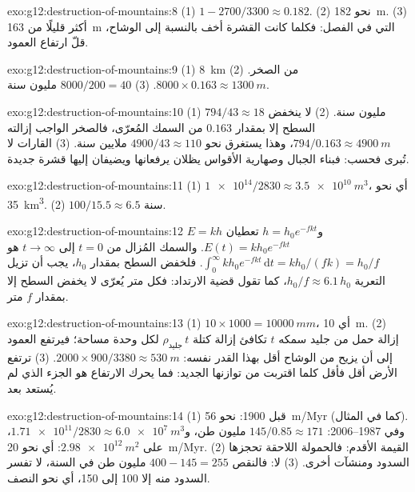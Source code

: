 \begin{solution}{exo:g12:destruction-of-mountains:8}
(1) $1 - 2700/3300 \approx 0.182$. (2) نحو \qty{182}{m}. (3) أكثر قليلًا
من \qty{163}{m} التي في الفصل: فكلما كانت القشرة أخف بالنسبة إلى
الوشاح، قلّ ارتفاع العمود.
\end{solution}

\begin{solution}{exo:g12:destruction-of-mountains:9}
(1) \qty{8}{km} من الصخر. (2) $8000 \times 0.163 \approx \qty{1300}{m}$.
(3) $8000/200 = 40$ مليون سنة.
\end{solution}

\begin{solution}{exo:g12:destruction-of-mountains:10}
(1) $794/43 \approx 18$ مليون سنة. (2) لا ينخفض السطح إلا بمقدار
$0.163$ من السمك المُعرّى، فالصخر الواجب إزالته $794/0.163
\approx \qty{4900}{m}$، وهذا يستغرق نحو $4900/43 \approx 110$ ملايين سنة.
(3) القارات لا تُبرى فحسب: فبناء الجبال وصهارية
الأقواس يظلان يرفعانها ويضيفان إليها قشرة جديدة.
\end{solution}

\begin{solution}{exo:g12:destruction-of-mountains:11}
(1) $\num{1e14}/2830 \approx \qty{3.5e10}{m^3}$، أي نحو
\qty{35}{km^3}. (2) $100/15.5 \approx 6.5$ سنة.
\end{solution}

\begin{solution}{exo:g12:destruction-of-mountains:12}
$E = kh$ و$h = h_0 e^{-fkt}$ تعطيان $E(t) = kh_0 e^{-fkt}$. والسمك
المُزال من $t = 0$ إلى $t \to \infty$ هو $\int_0^{\infty} kh_0
e^{-fkt}\,\mathrm{d}t = kh_0/(fk) = h_0/f$. فلخفض السطح بمقدار $h_0$،
يجب أن تزيل التعرية $h_0/f \approx 6.1\,h_0$، كما تقول قضية
الارتداد: فكل متر يُعرّى لا يخفض السطح إلا بمقدار $f$ متر.
\end{solution}

\begin{solution}{exo:g12:destruction-of-mountains:13}
(1) $10 \times 1000 = \qty{10000}{mm}$، أي \qty{10}{m}. (2) إزالة حمل من
جليد سمكه $t$ تكافئ إزالة كتلة $\rho_{\text{جليد}}\,t$ لكل وحدة
مساحة؛ فيرتفع العمود إلى أن يزيح من الوشاح أقل بهذا القدر نفسه:
$2000 \times 900/3380 \approx \qty{530}{m}$. (3) ترتفع الأرض أقل فأقل
كلما اقتربت من توازنها الجديد: فما يحرك الارتفاع هو الجزء الذي لم
يُستعد بعد.
\end{solution}

\begin{solution}{exo:g12:destruction-of-mountains:14}
(1) قبل 1900: نحو \qty{56}{m/Myr} (كما في المثال). وفي
1987--2006: $145/0.85 \approx 171$ مليون طن، و$\num{1.71e11}/2830
\approx \qty{6.0e7}{m^3}$، على $\qty{2.98e12}{m^2}$: أي نحو
\qty{20}{m/Myr}. (2) القيمة الأقدم: فالحمولة اللاحقة تحجزها السدود
ومنشآت أخرى. (3) لا: فالنقص $400 - 145 = 255$ مليون طن في
السنة، لا تفسر السدود منه إلا 100 إلى 150، أي نحو النصف.
\end{solution}

